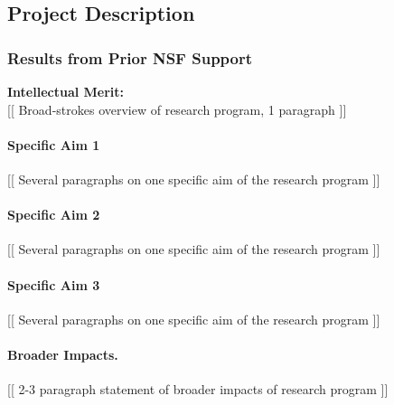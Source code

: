 \documentclass[12pt]{article}
\begin{document}
\setcounter{secnumdepth}{4} \renewcommand{\thesubsection}{\Alph{subsection}}
\renewcommand{\thesubsubsection}{\arabic{subsubsection}}

\subsection*{Project Description}

\subsubsection{Results from Prior NSF Support}

{\bf Intellectual Merit:} \\

[[ Broad-strokes overview of research program, 1 paragraph ]]\\

\paragraph{Specific Aim 1}

[[ Several paragraphs on one specific aim of the research program ]]\\

\paragraph{Specific Aim 2}

[[ Several paragraphs on one specific aim of the research program ]]\\

\paragraph{Specific Aim 3}

[[ Several paragraphs on one specific aim of the research program ]]\\

\vspace*{-4mm} \paragraph{Broader Impacts.}

[[ 2-3 paragraph statement of broader impacts of research program ]]\\
\end{document}
